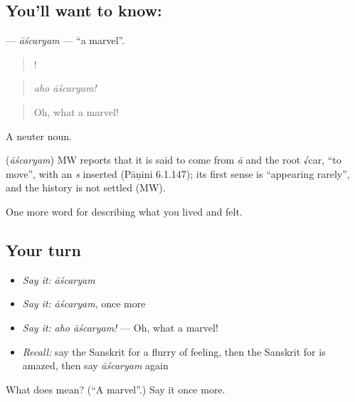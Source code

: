 \subsection*{You'll want to know: }
\textbf{} — \emph{āścaryam} — \textquotedblleft{}a marvel\textquotedblright{}.

\begin{quote}
 !
\end{quote}

\begin{quote}
\emph{aho āścaryam!}
\end{quote}

\begin{quote}
Oh, what a marvel!
\end{quote}

A neuter noun.

\begin{cousinweb}
\textbf{} (\emph{āścaryam}) MW reports that it is said to come from \emph{ā} and the root √car, \textquotedblleft{}to move\textquotedblright{}, with an \emph{s} inserted (Pāṇini 6.1.147); its first sense is \textquotedblleft{}appearing rarely\textquotedblright{}, and the history is not settled (MW).
\end{cousinweb}

\begin{grammarlens}[title={What you've built}]
One more word for describing what you lived and felt.
\end{grammarlens}

\subsection*{Your turn}
\begin{itemize}
\raggedright
  \item \emph{Say it:} \emph{āścaryam}
  \item \emph{Say it:} \emph{āścaryam}, once more
  \item \emph{Say it:} \emph{aho āścaryam!} — Oh, what a marvel!
  \item \emph{Recall:} say the Sanskrit for a flurry of feeling, then the Sanskrit for is amazed, then say \emph{āścaryam} again
\end{itemize}

\begin{tcolorbox}[breakable,colback=teal!4,colframe=teal!35!black,title={Before you move on}]
What does  mean? (\textquotedblleft{}A marvel\textquotedblright{}.) Say it once more.
\end{tcolorbox}
